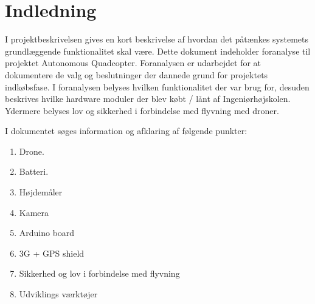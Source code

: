 \section{Indledning}

I projektbeskrivelsen gives en kort beskrivelse af hvordan det påtænkes systemets grundlæggende funktionalitet skal være. Dette dokument indeholder foranalyse til projektet Autonomous Quadcopter. 
Foranalysen er udarbejdet for at dokumentere de valg og beslutninger der dannede grund for projektets indkøbsfase. I foranalysen belyses hvilken funktionalitet der var brug for, desuden beskrives hvilke hardware moduler der blev købt / lånt af Ingeniørhøjskolen. Ydermere belyses lov og sikkerhed i forbindelse med flyvning med droner.

I dokumentet søges information og afklaring af følgende punkter:
\begin{enumerate}[label*=\arabic*.]
	\item Drone.
	\item Batteri. 
	\item Højdemåler
	\item Kamera
	\item Arduino board
	\item 3G + GPS shield
	\item Sikkerhed og lov i forbindelse med flyvning
	\item Udviklings værktøjer
\end{enumerate}